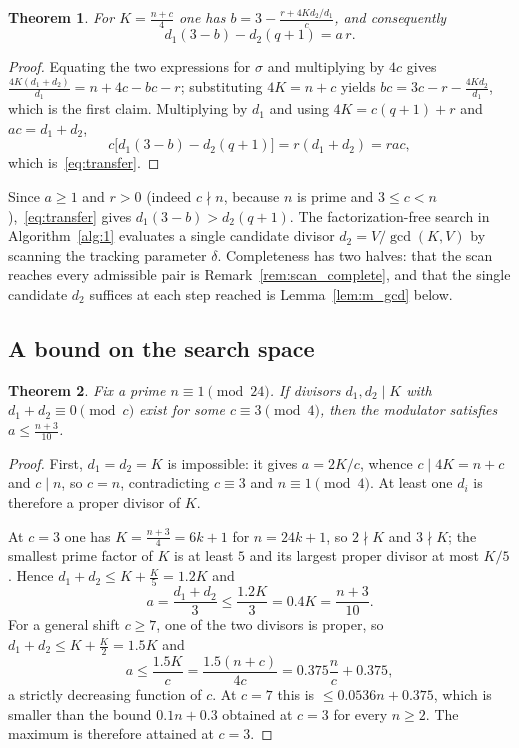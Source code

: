 \documentclass[11pt, a4paper]{article}
\theoremstyle{plain}
\newtheorem{theorem}{Theorem}[section]
\theoremstyle{definition}
\begin{document}
\begin{theorem}\label{thm:3.6}
For $K = \frac{n+c}{4}$ one has $b = 3 - \frac{r + 4K d_2/d_1}{c}$, and consequently
\begin{equation}\label{eq:transfer}
d_1(3-b) - d_2(q+1) = a\, r .
\end{equation}
\end{theorem}
\begin{proof}
Equating the two expressions for $\sigma$ and multiplying by $4c$ gives $\frac{4K(d_1+d_2)}{d_1} = n+4c-bc-r$; substituting $4K=n+c$ yields $bc = 3c-r-\frac{4Kd_2}{d_1}$, which is the first claim. Multiplying by $d_1$ and using $4K = c(q+1) + r$ and $ac = d_1+d_2$,
$$ c\big[d_1(3-b) - d_2(q+1)\big] = r(d_1 + d_2) = r a c, $$
which is~\eqref{eq:transfer}.
\end{proof}

Since $a \ge 1$ and $r > 0$ (indeed $c \nmid n$, because $n$ is prime and $3 \le c < n$),~\eqref{eq:transfer} gives $d_1(3-b) > d_2(q+1)$. The factorization-free search in Algorithm~\ref{alg:1} evaluates a single candidate divisor $d_2=V/\gcd(K,V)$ by scanning the tracking parameter $\delta$. Completeness has two halves: that the scan reaches every admissible pair is Remark~\ref{rem:scan_complete}, and that the single candidate $d_2$ suffices at each step reached is Lemma~\ref{lem:m_gcd} below.

\subsection{A bound on the search space}\label{sec:3.4}
\begin{theorem}\label{thm:3.10}
Fix a prime $n \equiv 1 \pmod{24}$. If divisors $d_1, d_2 \mid K$ with $d_1 + d_2 \equiv 0 \pmod{c}$ exist for some $c \equiv 3 \pmod{4}$, then the modulator satisfies $a \le \frac{n+3}{10}$.
\end{theorem}
\begin{proof}
First, $d_1=d_2=K$ is impossible: it gives $a=2K/c$, whence $c\mid 4K=n+c$ and $c\mid n$, so $c=n$, contradicting $c\equiv3$ and $n\equiv1\pmod 4$. At least one $d_i$ is therefore a proper divisor of $K$.

At $c=3$ one has $K=\frac{n+3}{4}=6k+1$ for $n=24k+1$, so $2\nmid K$ and $3\nmid K$; the smallest prime factor of $K$ is at least $5$ and its largest proper divisor at most $K/5$. Hence $d_1+d_2\le K+\frac K5=1.2K$ and
$$ a = \frac{d_1+d_2}{3} \le \frac{1.2K}{3} = 0.4K = \frac{n+3}{10}. $$
For a general shift $c \ge 7$, one of the two divisors is proper, so $d_1+d_2\le K+\frac K2=1.5K$ and
$$a \le \frac{1.5 K}{c} = \frac{1.5 (n+c)}{4c} = 0.375 \frac{n}{c} + 0.375,$$
a strictly decreasing function of $c$. At $c=7$ this is $\le 0.0536n+0.375$, which is smaller than the bound $0.1n+0.3$ obtained at $c=3$ for every $n\ge2$. The maximum is therefore attained at $c=3$.
\end{proof}
\end{document}
